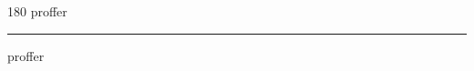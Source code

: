 
\begin{frame}
\begin{center}
\begin{turn}{180}
{\fontsize{2.5cm}{1em}\selectfont proffer}
\end{turn}
\vspace{1em}\par  
\hrule
\vspace{1em}\par  
{\fontsize{2.5cm}{1em}\selectfont proffer}
\end{center}
\end{frame}
